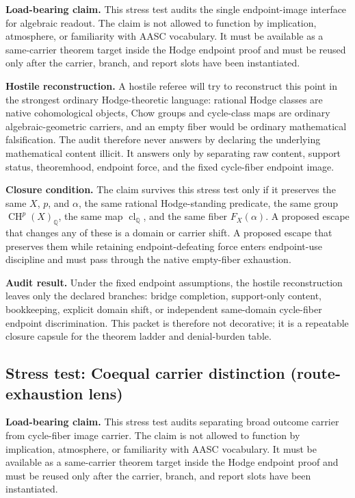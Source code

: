 \documentclass[11pt]{article}
\newcommand{\QQ}{\mathbb{Q}}
\newcommand{\CH}{\operatorname{CH}}
\newcommand{\clQ}{\operatorname{cl}_{\QQ}}
\begin{document}
\par\noindent\textbf{Load-bearing claim.} This stress test audits the single endpoint-image interface for algebraic readout. The claim is not allowed to function by implication, atmosphere, or familiarity with AASC vocabulary. It must be available as a same-carrier theorem target inside the Hodge endpoint proof and must be reused only after the carrier, branch, and report slots have been instantiated.

\par\noindent\textbf{Hostile reconstruction.} A hostile referee will try to reconstruct this point in the strongest ordinary Hodge-theoretic language: rational Hodge classes are native cohomological objects, Chow groups and cycle-class maps are ordinary algebraic-geometric carriers, and an empty fiber would be ordinary mathematical falsification. The audit therefore never answers by declaring the underlying mathematical content illicit. It answers only by separating raw content, support status, theoremhood, endpoint force, and the fixed cycle-fiber endpoint image.

\par\noindent\textbf{Closure condition.} The claim survives this stress test only if it preserves the same $X$, $p$, and $\alpha$, the same rational Hodge-standing predicate, the same group $\CH^p(X)_\QQ$, the same map $\clQ$, and the same fiber $F_X(\alpha)$. A proposed escape that changes any of these is a domain or carrier shift. A proposed escape that preserves them while retaining endpoint-defeating force enters endpoint-use discipline and must pass through the native empty-fiber exhaustion.

\par\noindent\textbf{Audit result.} Under the fixed endpoint assumptions, the hostile reconstruction leaves only the declared branches: bridge completion, support-only content, bookkeeping, explicit domain shift, or independent same-domain cycle-fiber endpoint discrimination. This packet is therefore not decorative; it is a repeatable closure capsule for the theorem ladder and denial-burden table.


\subsection{Stress test: Coequal carrier distinction (route-exhaustion lens)}

\par\noindent\textbf{Load-bearing claim.} This stress test audits separating broad outcome carrier from cycle-fiber image carrier. The claim is not allowed to function by implication, atmosphere, or familiarity with AASC vocabulary. It must be available as a same-carrier theorem target inside the Hodge endpoint proof and must be reused only after the carrier, branch, and report slots have been instantiated.
\end{document}
